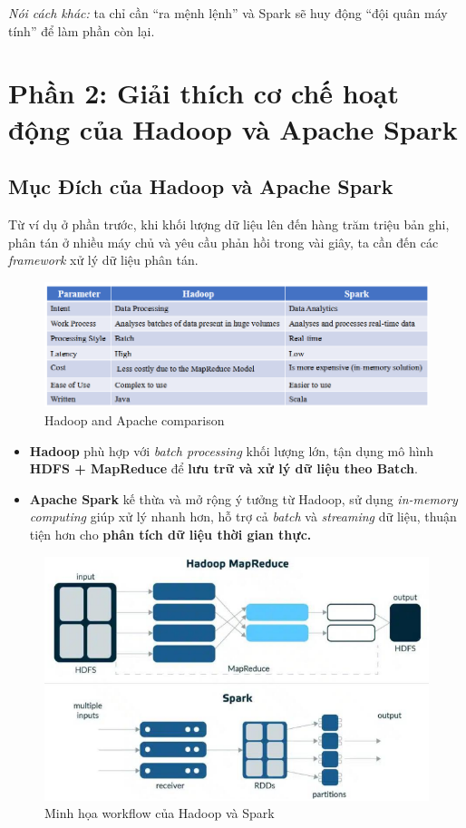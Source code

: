 \documentclass[11pt]{article}
\begin{document}
\noindent\textit{Nói cách khác:} ta chỉ cần ``ra mệnh lệnh'' và Spark sẽ huy động ``đội quân máy tính'' để làm phần còn lại.


\section{Phần 2: Giải thích cơ chế hoạt động của Hadoop và Apache Spark}

\subsection{Mục Đích của Hadoop và Apache Spark}
Từ ví dụ ở phần trước, khi khối lượng dữ liệu lên đến hàng trăm triệu bản ghi, phân tán ở nhiều máy chủ và yêu cầu phản hồi trong vài giây, ta cần đến các \textit{framework} xử lý dữ liệu phân tán.
\begin{figure}[H]
    \centering
    \includegraphics[width=0.7\linewidth]{HadoopPysparkComparison.png}
    \caption{Hadoop and Apache comparison}
\end{figure}
\begin{itemize}
    \item \textbf{Hadoop} phù hợp với \textit{batch processing} khối lượng lớn, tận dụng mô hình \textbf{HDFS + MapReduce} để \textbf{lưu trữ và xử lý dữ liệu theo Batch}.
    \item \textbf{Apache Spark} kế thừa và mở rộng ý tưởng từ Hadoop, sử dụng \textit{in-memory computing} giúp xử lý nhanh hơn, hỗ trợ cả \textit{batch} và \textit{streaming} dữ liệu, thuận tiện hơn cho \textbf{phân tích dữ liệu thời gian thực.}
\end{itemize}

\begin{figure}[H]
    \centering
    \includegraphics[width=0.7\linewidth]{hd_vs_sp.png}
    \caption{Minh họa workflow của Hadoop và Spark}
\end{figure}
\end{document}
